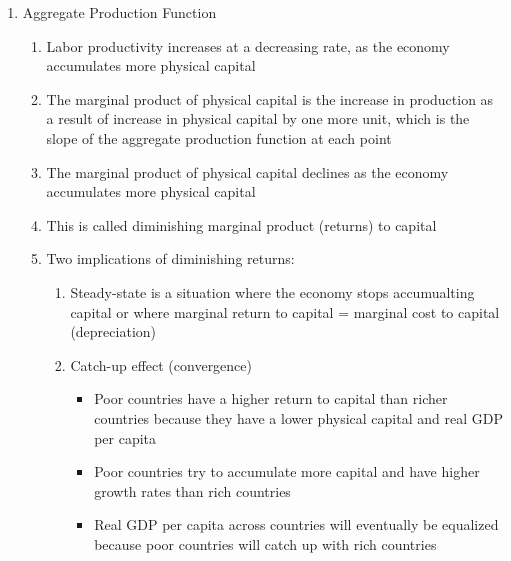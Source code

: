 \documentclass[12pt]{article}
\begin{document}
\begin{enumerate}
\begin{enumerate}
\begin{enumerate}
            \end{enumerate}

          \item Aggregate Production Function

            \begin{enumerate}

              \item Labor productivity increases at a decreasing rate, as the economy accumulates more physical capital

              \item The marginal product of physical capital is the increase in production as a result of increase in physical capital by one more unit, which is the slope of the aggregate production function at each point

              \item The marginal product of physical capital declines as the economy accumulates more physical capital

              \item This is called diminishing marginal product (returns) to capital

              \item Two implications of diminishing returns:

                \begin{enumerate}
                    
                  \item Steady-state is a situation where the economy stops accumualting capital or where marginal return to capital = marginal cost to capital (depreciation)

                  \item Catch-up effect (convergence)

                    \begin{itemize}

                      \item Poor countries have a higher return to capital than richer countries because they have a lower physical capital and real GDP per capita

                      \item Poor countries try to accumulate more capital and have higher growth rates than rich countries

                      \item Real GDP per capita across countries will eventually be equalized because poor countries will catch up with rich countries


\end{itemize}
\end{enumerate}
\end{enumerate}
\end{enumerate}
\end{enumerate}
\end{document}
